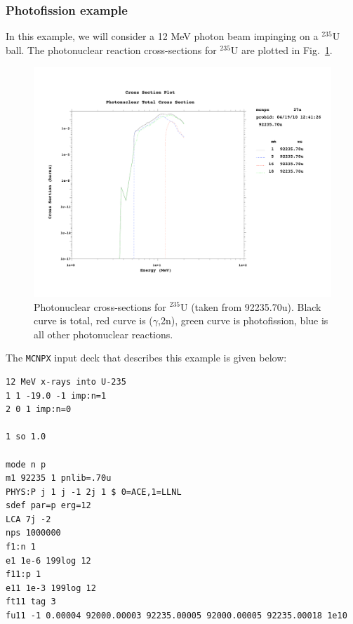 \subsubsection*{Photofission example}

In this example, we will consider a 12 MeV photon beam impinging on a $^{235}$U ball. The photonuclear reaction cross-sections for $^{235}$U are plotted in Fig.~\ref{fig:U-235 photonuclear cross-section}.
%
\begin{figure}[ht]
\begin{center}
\includegraphics[scale=0.6, angle=0]{eps/92235_photonuclear.pdf}
\end{center}
\caption{Photonuclear cross-sections for $^{235}$U (taken from 92235.70u). Black curve is total, red curve is ($\gamma$,2n), green curve is photofission, blue is all other photonuclear reactions.} 
\label{fig:U-235 photonuclear cross-section}
\end{figure}

The {\tt MCNPX} input deck that describes this example is given below:
{\scriptsize
\begin{verbatim}
12 MeV x-rays into U-235
1 1 -19.0 -1 imp:n=1
2 0 1 imp:n=0

1 so 1.0

mode n p
m1 92235 1 pnlib=.70u
PHYS:P j 1 j -1 2j 1 $ 0=ACE,1=LLNL
sdef par=p erg=12
LCA 7j -2
nps 1000000
f1:n 1
e1 1e-6 199log 12
f11:p 1
e11 1e-3 199log 12
ft11 tag 3
fu11 -1 0.00004 92000.00003 92235.00005 92000.00005 92235.00018 1e10
\end{verbatim}}

